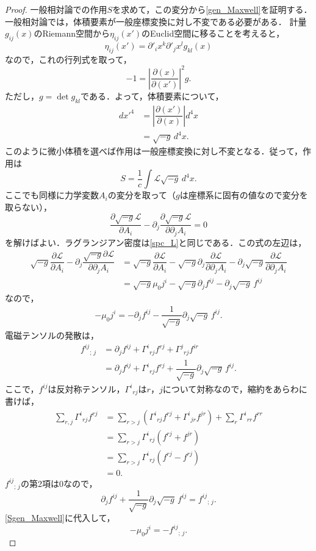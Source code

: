\documentclass[a4paper]{ltjsreport}
\begin{document}
\begin{proof}
  一般相対論での作用$S$を求めて，この変分から\eqref{gen_Maxwell}を証明する．
  一般相対論では，体積要素が一般座標変換に対し不変である必要がある．
  計量$g_{ij}(x)$のRiemann空間から$\eta_{ij}(x')$のEuclid空間に移ることを考えると，
  \[ \eta_{ij}(x')=\partial'_i{x^k}\partial'_j{x^l}g_{kl}(x) \]
  なので，これの行列式を取って，
  \[ - 1=\left|\dfrac{\partial(x)}{\partial(x')}\right|^2g .\]
  ただし，$g=\det{g_{kl}}$である．よって，体積要素について，
  \begin{align*}
    dx'^4 &= \left|\dfrac{\partial(x')}{\partial(x)}\right|d^4x\\
    &= \sqrt{ - g}\,d^4x .
  \end{align*}
  このように微小体積を選べば作用は一般座標変換に対し不変となる．従って，作用は
  \[ S = \dfrac{1}{c}\int{}\mathcal{L}\sqrt{ - g}\,d^4x . \]
  ここでも同様に力学変数$A_i$の変分を取って（$g$は座標系に固有の値なので変分を取らない），
  \[
  \dfrac{\partial{\sqrt{ - g}\mathcal{L}}}{\partial{}A_i} - \partial_j\dfrac{\partial{\sqrt{ - g}\mathcal{L}}}{\partial\partial_jA_i} = 0
  \]
  を解けばよい．ラグランジアン密度は\eqref{spc_L}と同じである．この式の左辺は，
  \begin{align*}
    \sqrt{ - g}\dfrac{\partial{\mathcal{L}}}{\partial{}A_i} - \partial_j\dfrac{\sqrt{ - g}\partial{\mathcal{L}}}{\partial\partial_jA_i}
    &= \sqrt{ - g}\dfrac{\partial{\mathcal{L}}}{\partial{}A_i} - \sqrt{ - g}\partial_j\dfrac{\partial{\mathcal{L}}}{\partial\partial_jA_i}
    - \partial_j\sqrt{ - g}\dfrac{\partial{\mathcal{L}}}{\partial\partial_jA_i}\\
    &= \sqrt{ - g}\mu_0j^i - \sqrt{ - g}\partial_jf^{ij} - \partial_j\sqrt{ - g}\,f^{ij}
  \end{align*}
  なので，
  \begin{align}
    - \mu_0j^i= - \partial_jf^{ij} - \dfrac{1}{\sqrt{ - g}}\partial_j\sqrt{ - g}\,f^{ij} . \label{Sgen_Maxwell}
  \end{align}
  電磁テンソルの発散は，
  \begin{align*}
    {f^{ij}}_{;\,j} &= \partial_jf^{ij} + {\Gamma^i}_{rj}f^{rj} + {\Gamma^j}_{rj}f^{ir}\\
    &= \partial_jf^{ij} + {\Gamma^i}_{rj}f^{rj} + \dfrac{1}{\sqrt{ - g}}\partial_j\sqrt{ - g}\,f^{ij} .
  \end{align*}
  ここで，$f^{ij}$は反対称テンソル，${\Gamma^i}_{rj}$は$r$，$j$について対称なので，縮約をあらわに書けば，
  \begin{align*}
    \sum_{r,j}{\Gamma^i}_{rj}f^{rj} &= \sum_{r>j}\left({\Gamma^i}_{rj}f^{rj} + {\Gamma^i}_{jr}f^{jr}\right) + \sum_{r}{\Gamma^i}_{rr}f^{rr}\\
    &= \sum_{r>j}{\Gamma^i}_{rj}\left(f^{rj} + f^{jr}\right)\\
    &= \sum_{r>j}{\Gamma^i}_{rj}\left(f^{rj} - f^{rj}\right)\\
    &= 0 .
  \end{align*}
  ${f^{ij}}_{;\,j}$の第2項は$0$なので，
  \[ \partial_jf^{ij} + \dfrac{1}{\sqrt{ - g}}\partial_j\sqrt{ - g}\,f^{ij}={f^{ij}}_{;\,j} . \]
  \eqref{Sgen_Maxwell}に代入して，
  \[  - \mu_0j^i =  - {f^{ij}}_{;\,j} . \]
\end{proof}
\end{document}

